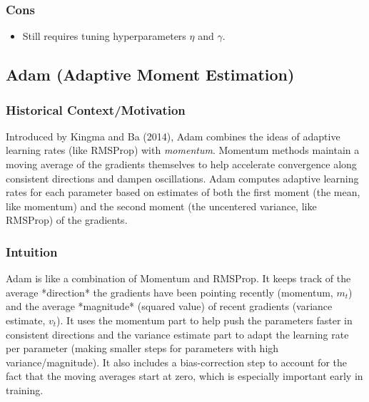 \documentclass{article}
\begin{document}
\subsubsection{Cons}
\begin{itemize}
    \item Still requires tuning hyperparameters $\eta$ and $\gamma$.
\end{itemize}

\subsection{Adam (Adaptive Moment Estimation)}

\subsubsection{Historical Context/Motivation}
Introduced by Kingma and Ba (2014), Adam combines the ideas of adaptive learning rates (like RMSProp) with \emph{momentum}. Momentum methods maintain a moving average of the gradients themselves to help accelerate convergence along consistent directions and dampen oscillations. Adam computes adaptive learning rates for each parameter based on estimates of both the first moment (the mean, like momentum) and the second moment (the uncentered variance, like RMSProp) of the gradients.

\subsubsection{Intuition}
Adam is like a combination of Momentum and RMSProp. It keeps track of the average *direction* the gradients have been pointing recently (momentum, $m_t$) and the average *magnitude* (squared value) of recent gradients (variance estimate, $v_t$). It uses the momentum part to help push the parameters faster in consistent directions and the variance estimate part to adapt the learning rate per parameter (making smaller steps for parameters with high variance/magnitude). It also includes a bias-correction step to account for the fact that the moving averages start at zero, which is especially important early in training.
\end{document}
